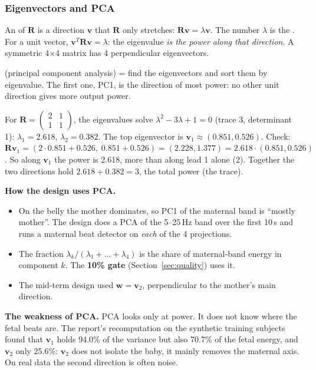 \documentclass[11pt]{article}
\begin{document}
\subsubsection{Eigenvectors and PCA}
An  of $\mathbf{R}$ is a direction $\mathbf{v}$ that $\mathbf{R}$ only stretches: $\mathbf{R}\mathbf{v} = \lambda\mathbf{v}$. The number $\lambda$ is the . For a unit vector, $\mathbf{v}^T\mathbf{R}\mathbf{v} = \lambda$: the eigenvalue \emph{is the power along that direction}. A symmetric 4$\times$4 matrix has 4 perpendicular eigenvectors.

 (principal component analysis) = find the eigenvectors and sort them by eigenvalue. The first one, PC1, is the direction of most power: no other unit direction gives more output power.

\begin{simple}
For $\mathbf{R} = \begin{pmatrix}2&1\\1&1\end{pmatrix}$, the eigenvalues solve $\lambda^2 - 3\lambda + 1 = 0$ (trace 3, determinant 1): $\lambda_1 = 2.618$, $\lambda_2 = 0.382$. The top eigenvector is $\mathbf{v}_1 \approx (0.851, 0.526)$. Check: $\mathbf{R}\mathbf{v}_1 = (2\cdot0.851+0.526,\; 0.851+0.526) = (2.228, 1.377) = 2.618\cdot(0.851, 0.526)$. So along $\mathbf{v}_1$ the power is 2.618, more than along lead 1 alone (2). Together the two directions hold $2.618 + 0.382 = 3$, the total power (the trace).
\end{simple}

\textbf{How the design uses PCA.}
\begin{itemize}
  \item On the belly the mother dominates, so PC1 of the maternal band is ``mostly mother''. The design does a PCA of the 5--25\,Hz band over the first 10\,s and runs a maternal beat detector on \emph{each} of the 4 projections.
  \item The fraction $\lambda_k / (\lambda_1+\dots+\lambda_4)$ is the share of maternal-band energy in component $k$. The \textbf{10\% gate} (Section~\ref{sec:quality}) uses it.
  \item The mid-term design used $\mathbf{w} = \mathbf{v}_2$, perpendicular to the mother's main direction.
\end{itemize}
\textbf{The weakness of PCA.} PCA looks only at power. It does not know where the fetal beats are. The report's recomputation on the synthetic training subjects found that $\mathbf{v}_1$ holds 94.0\% of the variance but also 70.7\% of the fetal energy, and $\mathbf{v}_2$ only 25.6\%: $\mathbf{v}_2$ does not isolate the baby, it mainly removes the maternal axis. On real data the second direction is often noise.
\end{document}
